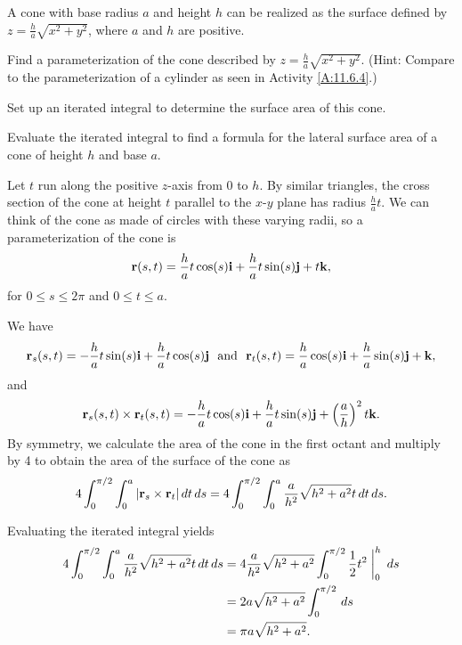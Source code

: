 \begin{exercises}
\item A cone with base radius $a$ and height $h$ can be realized as the surface defined by $z = \frac{h}{a} \sqrt{x^2+y^2}$, where $a$ and $h$ are positive.  
 	\ba
	\item Find a parameterization of the cone described by $z = \frac{h}{a} \sqrt{x^2+y^2}$. (Hint: Compare to the parameterization of a cylinder as seen in Activity  \ref{A:11.6.4}.) 
	
	\item Set up an iterated integral to determine the surface area of this cone.
	
	\item Evaluate the iterated integral to find a formula for the lateral surface area of a cone of height $h$ and base $a$. 
	
	\ea

\begin{exerciseSolution}
\ba
\item Let $t$ run along the positive $z$-axis from 0 to $h$. By similar triangles, the cross section of the cone at height $t$ parallel to the $x$-$y$ plane has radius $\frac{h}{a}t$. We can think of the cone as made of circles with these varying radii, so a parameterization of the cone is 
\[\mathbf{r}(s,t) = \frac{h}{a}t \cos(s) \mathbf{i} + \frac{h}{a}t \sin(s) \mathbf{j} + t \mathbf{k},\]
for $0 \leq s \leq 2 \pi$ and $0 \leq t \leq a$. 

\item We have 
\[\vr_s(s,t) = -\frac{h}{a}t\sin(s) \vi + \frac{h}{a}t\cos(s) \vj  \ \text{ and } \ \vr_t(s,t) =  \frac{h}{a} \cos(s) \vi + \frac{h}{a} \sin(s) \vj + \vk,\]
and
\[\mathbf{r}_s(s,t) \times \mathbf{r}_t(s,t) = -\frac{h}{a}t\cos(s) \mathbf{i} + \frac{h}{a}t\sin(s) \mathbf{j} + \left(\frac{a}{h}\right)^2 t \mathbf{k}.\]
By symmetry, we calculate the area of the cone in the first octant and multiply by 4 to obtain the area of the surface of the cone as
\[4\int_0^{\pi/2} \int_0^a |\mathbf{r}_s \times \mathbf{r}_t| \, dt \, ds = 4\int_0^{\pi/2} \int_0^a \frac{a}{h^2} \sqrt{h^2+a^2} t \, dt \, ds.\]

\item Evaluating the iterated integral yields
\begin{align*}
4\int_0^{\pi/2} \int_0^a \frac{a}{h^2} \sqrt{h^2+a^2} t \, dt \, ds &= 4\frac{a}{h^2} \sqrt{h^2+a^2} \int_0^{\pi/2} \frac{1}{2}t^2 \biggm|_0^h \, ds \\
	&= 2 a \sqrt{h^2+a^2} \int_{0}^{\pi/2}  \, ds \\
	&= \pi  a \sqrt{h^2+a^2}. 
\end{align*}

\ea
\end{exerciseSolution}
\end{exercises}
\afterexercises
